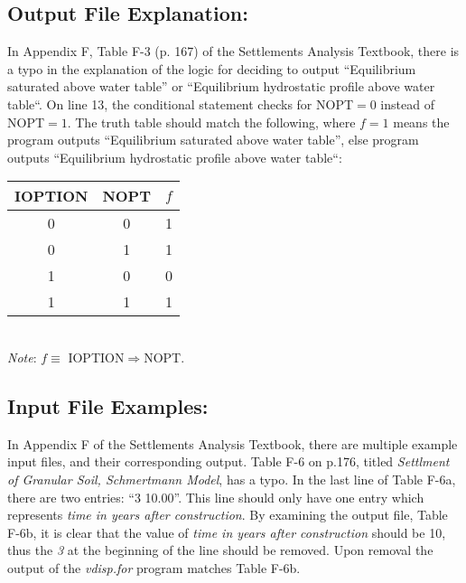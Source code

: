 \documentclass[11pt,fleqn]{article}
\newcommand{\indentpar}{\phantom{=}}
\begin{document}
    \subsection*{Output File Explanation:}
    \indentpar In Appendix F, Table F-3 (p. 167) of the Settlements Analysis Textbook,
    there is a typo in the explanation of the logic for deciding to output “Equilibrium 
    saturated above water table” or “Equilibrium hydrostatic profile above water table“.
    On line 13, the conditional statement checks for NOPT$=0$ instead of NOPT$=1$. The 
    truth table should match the following, where $f=1$ means the program outputs “Equilibrium 
    saturated above water table”, else program outputs “Equilibrium hydrostatic profile above 
    water table“:
    \begin{center}
        \begin{tabular}{|c|c|c|}
            \hline 
            IOPTION & NOPT & $f$ \\
            \hline 
            0 & 0 & 1 \\
            \hline
            0 & 1 & 1 \\
            \hline 
            1 & 0 & 0 \\
            \hline 
            1 & 1 & 1 \\
            \hline
        \end{tabular}
        \\
        \medskip
        \textit{Note}: $f \equiv$ IOPTION$\Rightarrow$NOPT.
    \end{center}

    \subsection*{Input File Examples:}
    \indentpar In Appendix F of the Settlements Analysis Textbook, there are multiple example 
    input files, and their corresponding output. Table F-6 on p.176, titled \emph{Settlment of 
    Granular Soil, Schmertmann Model}, has a typo. In the last line of Table F-6a, there are 
    two entries: “3 10.00”. This line should only have one entry which represents \emph{time in 
    years after construction}. By examining the output file, Table F-6b, it is clear that the value
    of \emph{time in years after construction} should be 10, thus the \emph{3} at the beginning of 
    the line should be removed. Upon removal the output of the \emph{vdisp.for} program matches
    Table F-6b.
     
\end{document}
